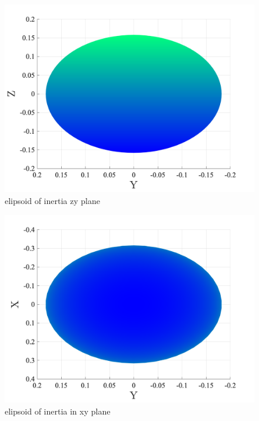 \begin{figure}[H]
    \caption{elipsoid of inertia zy plane}
    \centering
    \includegraphics[width=12cm]{../Figure/Q1/yz_view_elipsoid_inertia}
\end{figure}

\begin{figure}[H]
    \caption{elipsoid of inertia in xy plane}
    \centering
    \includegraphics[width=12cm]{../Figure/Q1/xy_view_elipsoid_inertia}
\end{figure}